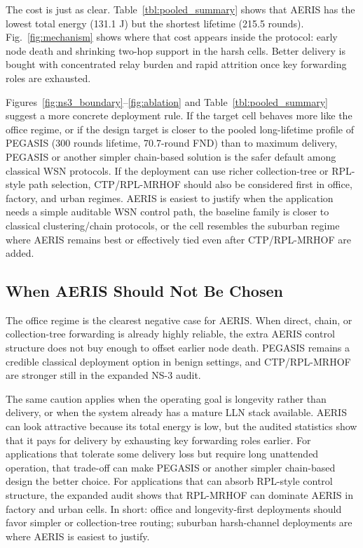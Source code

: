 \documentclass[conference]{IEEEtran}
\begin{document}
The cost is just as clear. Table~\ref{tbl:pooled_summary} shows that AERIS has the lowest total energy (131.1 J) but the shortest lifetime (215.5 rounds). Fig.~\ref{fig:mechanism} shows where that cost appears inside the protocol: early node death and shrinking two-hop support in the harsh cells. Better delivery is bought with concentrated relay burden and rapid attrition once key forwarding roles are exhausted.

Figures~\ref{fig:ns3_boundary}--\ref{fig:ablation} and Table~\ref{tbl:pooled_summary} suggest a more concrete deployment rule. If the target cell behaves more like the office regime, or if the design target is closer to the pooled long-lifetime profile of PEGASIS (300 rounds lifetime, 70.7-round FND) than to maximum delivery, PEGASIS or another simpler chain-based solution is the safer default among classical WSN protocols. If the deployment can use richer collection-tree or RPL-style path selection, CTP/RPL-MRHOF should also be considered first in office, factory, and urban regimes. AERIS is easiest to justify when the application needs a simple auditable WSN control path, the baseline family is closer to classical clustering/chain protocols, or the cell resembles the suburban regime where AERIS remains best or effectively tied even after CTP/RPL-MRHOF are added.

\subsection{When AERIS Should Not Be Chosen}
The office regime is the clearest negative case for AERIS. When direct, chain, or collection-tree forwarding is already highly reliable, the extra AERIS control structure does not buy enough to offset earlier node death. PEGASIS remains a credible classical deployment option in benign settings, and CTP/RPL-MRHOF are stronger still in the expanded NS-3 audit.

The same caution applies when the operating goal is longevity rather than delivery, or when the system already has a mature LLN stack available. AERIS can look attractive because its total energy is low, but the audited statistics show that it pays for delivery by exhausting key forwarding roles earlier. For applications that tolerate some delivery loss but require long unattended operation, that trade-off can make PEGASIS or another simpler chain-based design the better choice. For applications that can absorb RPL-style control structure, the expanded audit shows that RPL-MRHOF can dominate AERIS in factory and urban cells. In short: office and longevity-first deployments should favor simpler or collection-tree routing; suburban harsh-channel deployments are where AERIS is easiest to justify.
\end{document}
